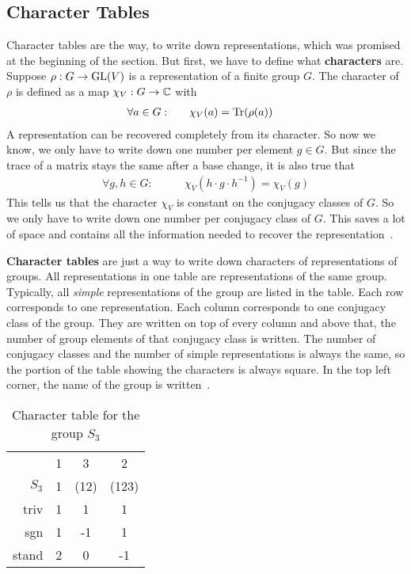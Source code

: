 \subsection{Character Tables}

Character tables are the way, to write down representations, which was promised at the beginning of the section.
But first, we have to define what \textbf{characters} are.
Suppose $\rho: G \to \operatorname{GL}(V)$ is a representation of a finite group $G$.
The character of $\rho$ is defined as a map $\chi_V: G \to \mathbb{C}$ with
\begin{align}
    \forall a \in G: \qquad & \chi_V(a) = \operatorname{Tr}(\rho(a))
\end{align}
A representation can be recovered completely from its character.
So now we know, we only have to write down one number per element $g \in G$.
But since the trace of a matrix stays the same after a base change, it is also true that
\begin{align}
    \forall g, h \in G: \qquad & \chi_V(h \cdot g \cdot h^{-1}) = \chi_V(g)
\end{align}
This tells us that the character $\chi_V$ is constant on the conjugacy classes of $G$.
So we only have to write down one number per conjugacy class of $G$.
This saves a lot of space and contains all the information needed to recover the representation~\cite{fulton2013}.

\textbf{Character tables} are just a way to write down characters of representations of groups.
All representations in one table are representations of the same group.
Typically, all \textit{simple} representations of the group are listed in the table.
Each row corresponds to one representation.
Each column corresponds to one conjugacy class of the group.
They are written on top of every column and above that, the number of group elements of that conjugacy class is written.
The number of conjugacy classes and the number of simple representations is always the same, so the portion of the table showing the characters is always square.
In the top left corner, the name of the group is written~\cite{fulton2013}.

\begin{table}
    \centering

    \begin{tabular}{r | c  c  c}
                & 1 & 3     & 2     \\
        $S_3$   & 1 & (12)  & (123) \\ \hline
        triv    & 1 & 1     & 1     \\
        sgn     & 1 & -1    & 1     \\
        stand   & 2 & 0     & -1
    \end{tabular}

    \caption{Character table for the group $S_3$}
    \label{tab:reprep.char.table}
\end{table}

